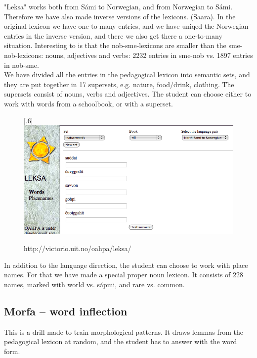 \documentclass[a4paper,12pt]{article}
\begin{document}
"Leksa" works both from Sámi to Norwegian, and from Norwegian to Sámi. Therefore we have also made inverse versions of the lexicons. (Saara). In the original lexicon we have one-to-many entries, and we have uniqed the Norwegian entries in the inverse version, and there we also get there a one-to-many situation. Interesting to is that the nob-sme-lexicons are smaller than the sme-nob-lexicons: nouns, adjectives and verbs: 2232 entries in sme-nob vs. 1897 entries in nob-sme.\\ 

We have divided all the entries in the pedagogical lexicon into semantic sets, and they are put together in 17 supersets, e.g. nature, food/drink, clothing. The supersets consist of nouns, verbs and adjectives. The student can choose either to work with words from a schoolbook, or with a superset. 
\vspace{0.5cm}

\begin{figure}[htbp]
\begin{center}
\scalebox{.6}[.6]{\includegraphics{img/leksa.png}}\\
\caption{http://victorio.uit.no/oahpa/leksa/}
\label{leksa}
\end{center}
\end{figure}

\vspace{0.5cm}
In addition to the language direction, the student can choose to work with place names. For that we have made a special proper noun lexicon. It consists of 228 names, marked with world vs. sápmi, and rare vs. common. 


\subsection{Morfa -- word inflection}
This is a drill made to train morphological patterns. It draws lemmas from the pedagogical lexicon at random, and the student has to answer with the word form. 
\end{document}
